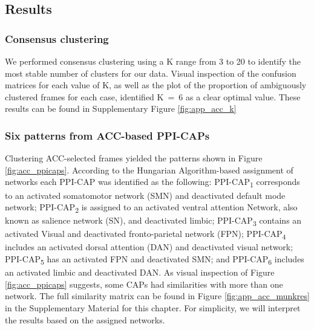 \subsection{Results}

\subsubsection{Consensus clustering}
We performed consensus clustering using a K range from 3 to 20 to identify the most stable number of clusters for our data. Visual inspection of the confusion matrices for each value of K, as well as the plot of the proportion of ambiguously clustered frames for each case, identified K~=~6 as a clear optimal value. These results can be found in Supplementary Figure \ref{fig:app_acc_k}

\subsubsection{Six patterns from ACC-based PPI-CAPs}
Clustering ACC-selected frames  yielded the patterns shown in Figure \ref{fig:acc_ppicaps}. According to the Hungarian Algorithm-based assignment of networks each PPI-CAP was identified as the following: PPI-CAP\textsubscript{1} corresponds to an activated somatomotor network (SMN) and deactivated default mode network;  PPI-CAP\textsubscript{2} is assigned to an activated ventral attention Network, also known as salience network (SN),  and deactivated limbic; PPI-CAP\textsubscript{3} contains an activated Visual and deactivated fronto-parietal network (FPN); PPI-CAP\textsubscript{4} includes an activated dorsal attention (DAN) and deactivated visual network; PPI-CAP\textsubscript{5} has an activated FPN and deactivated SMN; and PPI-CAP\textsubscript{6} includes an activated limbic and deactivated DAN. As visual inspection of Figure \ref{fig:acc_ppicaps} suggests, some CAPs had similarities with more than one network. The full similarity matrix can be found in Figure \ref{fig:app_acc_munkres} in the Supplementary Material for this chapter. For simplicity, we will interpret the results based on the assigned networks.









